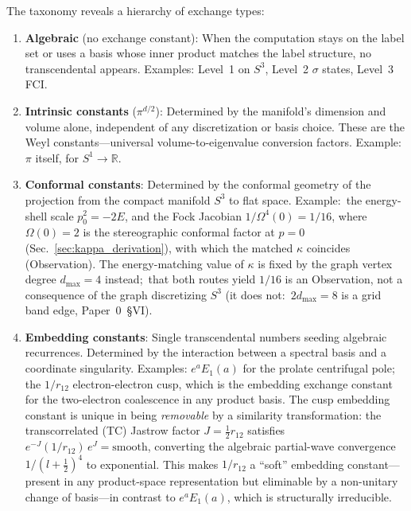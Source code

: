\documentclass[aps,pra,twocolumn,superscriptaddress,longbibliography]{revtex4-2}
\begin{document}
The taxonomy reveals a hierarchy of exchange types:
\begin{enumerate}
  \item \textbf{Algebraic} (no exchange constant): When the
    computation stays on the label set or uses a basis whose inner
    product matches the label structure, no transcendental
    appears.  Examples: Level~1 on $S^3$, Level~2 $\sigma$
    states, Level~3 FCI.

  \item \textbf{Intrinsic constants} ($\pi^{d/2}$): Determined
    by the manifold's dimension and volume alone, independent of
    any discretization or basis choice.  These are the Weyl
    constants---universal volume-to-eigenvalue conversion factors.
    Example: $\pi$ itself, for $S^1 \to \mathbb{R}$.

  \item \textbf{Conformal constants}: Determined by the conformal
    geometry of the projection from the compact manifold $S^3$ to
    flat space.  Example:\ the energy-shell scale $p_0^2 = -2E$, and
    the Fock Jacobian $1/\Omega^4(0) = 1/16$, where $\Omega(0) = 2$ is
    the stereographic conformal factor at $p = 0$
    (Sec.~\ref{sec:kappa_derivation}), with which the matched
    $\kappa$ coincides (Observation).  The energy-matching value of
    $\kappa$ is fixed by the graph vertex degree $d_{\max} = 4$
    instead;\ that both routes yield $1/16$ is an Observation, not a
    consequence of the graph discretizing $S^3$ (it does not:\
    $2 d_{\max} = 8$ is a grid band edge, Paper~0~\S VI).

  \item \textbf{Embedding constants}: Single transcendental
    numbers seeding algebraic recurrences.  Determined by the
    interaction between a spectral basis and a coordinate
    singularity.  Examples: $e^a E_1(a)$ for the prolate
    centrifugal pole; the $1/r_{12}$ electron-electron cusp,
    which is the embedding exchange constant for the two-electron
    coalescence in any product basis.
    The cusp embedding constant is unique in being \emph{removable}
    by a similarity transformation: the transcorrelated (TC)
    Jastrow factor $J = \tfrac{1}{2} r_{12}$ satisfies
    $e^{-J} (1/r_{12})\, e^{J} = \text{smooth}$, converting
    the algebraic partial-wave convergence $1/(l+\tfrac{1}{2})^4$
    to exponential.  This makes $1/r_{12}$ a ``soft'' embedding
    constant---present in any product-space representation but
    eliminable by a non-unitary change of basis---in contrast to
    $e^a E_1(a)$, which is structurally irreducible.


\end{enumerate}
\end{document}
